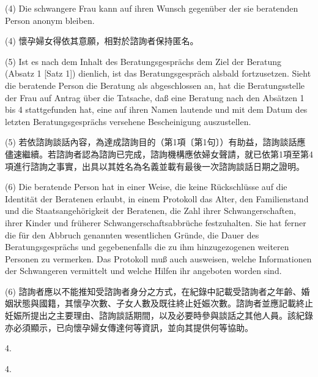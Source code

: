 \documentclass[12pt]{article}
\begin{document}
\begin{sourcepara}[title={原文主文 II.3(4)}]
(4) Die schwangere Frau kann auf ihren Wunsch gegenüber der sie beratenden Person anonym bleiben.
\end{sourcepara}
\begin{transpara}
(4) 懷孕婦女得依其意願，相對於諮詢者保持匿名。
\end{transpara}

\begin{sourcepara}[title={原文主文 II.3(5)}]
(5) Ist es nach dem Inhalt des Beratungsgesprächs dem Ziel der Beratung (Absatz 1 [Satz 1]) dienlich, ist das Beratungsgespräch alsbald fortzusetzen. Sieht die beratende Person die Beratung als abgeschlossen an, hat die Beratungsstelle der Frau auf Antrag über die Tatsache, daß eine Beratung nach den Absätzen 1 bis 4 stattgefunden hat, eine auf ihren Namen lautende und mit dem Datum des letzten Beratungsgesprächs versehene Bescheinigung auszustellen.
\end{sourcepara}
\begin{transpara}
(5) 若依諮詢談話內容，為達成諮詢目的（第1項〔第1句〕）有助益，諮詢談話應儘速繼續。若諮詢者認為諮詢已完成，諮詢機構應依婦女聲請，就已依第1項至第4項進行諮詢之事實，出具以其姓名為名義並載有最後一次諮詢談話日期之證明。
\end{transpara}

\begin{sourcepara}[title={原文主文 II.3(6)}]
(6) Die beratende Person hat in einer Weise, die keine Rückschlüsse auf die Identität der Beratenen erlaubt, in einem Protokoll das Alter, den Familienstand und die Staatsangehörigkeit der Beratenen, die Zahl ihrer Schwangerschaften, ihrer Kinder und früherer Schwangerschaftsabbrüche festzuhalten. Sie hat ferner die für den Abbruch genannten wesentlichen Gründe, die Dauer des Beratungsgesprächs und gegebenenfalls die zu ihm hinzugezogenen weiteren Personen zu vermerken. Das Protokoll muß auch ausweisen, welche Informationen der Schwangeren vermittelt und welche Hilfen ihr angeboten worden sind.
\end{sourcepara}
\begin{transpara}
(6) 諮詢者應以不能推知受諮詢者身分之方式，在紀錄中記載受諮詢者之年齡、婚姻狀態與國籍，其懷孕次數、子女人數及既往終止妊娠次數。諮詢者並應記載終止妊娠所提出之主要理由、諮詢談話期間，以及必要時參與談話之其他人員。該紀錄亦必須顯示，已向懷孕婦女傳達何等資訊，並向其提供何等協助。
\end{transpara}

\bikeepwithnext[6]
\begin{sourcepara}[title={原文主文 II.4 開頭}]
4.
\end{sourcepara}
\begin{transpara}
4.
\end{transpara}
\end{document}
